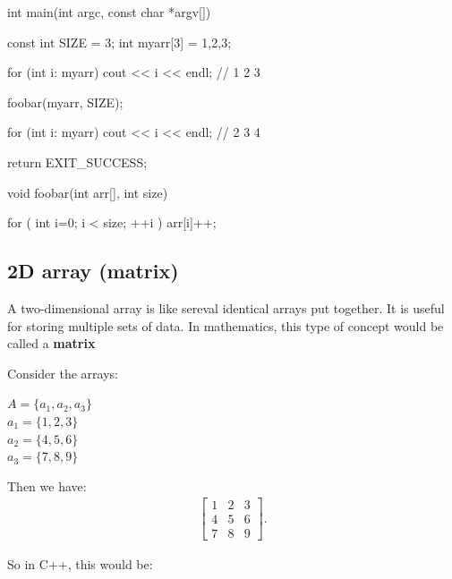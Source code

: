 \documentclass{report}
\begin{document}
    \begin{cppcode}
int main(int argc, const char *argv[]) {

    const int SIZE = 3;
    int myarr[3] = {1,2,3};

    for (int i: myarr) cout << i << endl; // 1 2 3

    foobar(myarr, SIZE);

    for (int i: myarr) cout << i << endl; // 2 3 4



    return EXIT_SUCCESS;
}

void foobar(int arr[], int size) {

    for ( int i=0; i < size; ++i ) {
        arr[i]++;
    }


}
    \end{cppcode}
    

    \bigbreak \noindent 

    \pagebreak \bigbreak \noindent 
    \subsection{2D array (matrix)}
    \bigbreak \noindent 
    \begin{concept}
 A two-dimensional array is like sereval identical arrays put together. It is useful for storing multiple sets of data. In mathematics, this type of concept would be called a \textbf{matrix}
	\end{concept}
    \bigbreak \noindent 
    \begin{minipage}[]{0.47\textwidth}
    Consider the arrays:
    \begin{center}
        $A = \{a_{1}, a_{2}, a_{3}\} $ \\
        $a_{1} = \{1,2,3\} $ \\
        $a_{2} = \{4,5,6\} $ \\
        $a_{3} = \{7,8,9\} $ \\
    \end{center}
    \end{minipage}
    \begin{minipage}[]{0.47\textwidth}
    Then we have:
    \begin{align*}
        \begin{bmatrix}
            1 & 2 & 3 \\
            4 & 5 & 6 \\
            7 & 8 & 9
        \end{bmatrix}
    .\end{align*}
    \end{minipage}
    \bigbreak \noindent 
    So in C++, this would be:
    \bigbreak \noindent 
    
\end{document}
